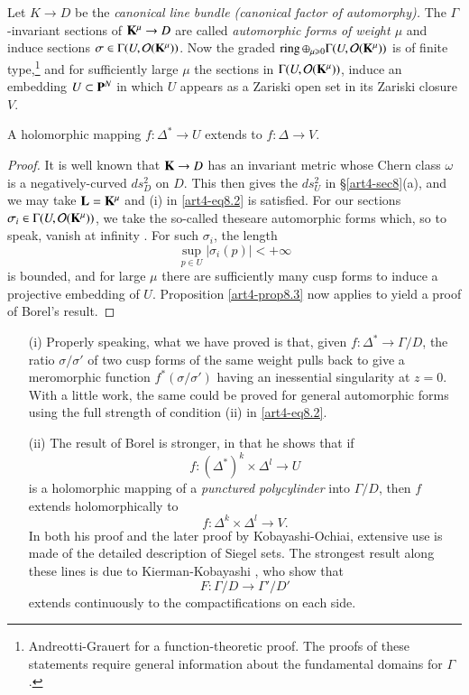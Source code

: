 Let $K \to D$ be the \textit{canonical line bundle (canonical factor of automorphy).} The $\Gamma$-invariant sections of $\mathbf{K}^\mu \to D$ are called \textit{automorphic forms of weight $\mu$} and induce sections $\sigma \in \Gamma (U, \mathcal{O} (\mathbf{K}^\mu))$. Now the graded $\operatorname{ring} \oplus_{\mu \geqslant 0} \Gamma (U, \mathcal{O}(\mathbf{K}^\mu))$ is of finite type,\footnote[36]{\cf Andreotti-Grauert \cite{art4-key1} for a function-theoretic proof. The proofs of these statements require general information about the fundamental domains for $\Gamma$.} and for sufficiently large $\mu$ the sections in $\Gamma (U,\mathcal{O} (\mathbf{K}^\mu))$, induce an embedding $U \subset \mathbf{P}^N$ in which $U$ appears as a Zariski open set in its Zariski closure $V$.

\begin{proposition}[Borel]\label{art4-eq8.12}
A holomorphic mapping $f : \Delta^\ast \to U$ extends to $f : \Delta \to V$.
\end{proposition}

\begin{proof}
It is well known that $\mathbf{K} \to D$ has an invariant metric whose Chern class $\omega$ is a negatively-curved $ds^2_D$ on $D$. This then gives the $ds^2_U$ in \S \ref{art4-sec8}(a), and we may take $\mathbf{L} = \mathbf{K}^\mu$ and (i) in \eqref{art4-eq8.2} is satisfied. For our sections $\sigma_i \in\Gamma (U,\mathcal{O} (\mathbf{K}^\mu))$, we take the so-called  these\pageoriginale are automorphic forms which, so to speak, vanish at infinity \cite{art4-key2}. For such $\sigma_i$, the length
$$
\sup_{p\in U} | \sigma_i(p) | < + \infty
$$
is bounded, and for large $\mu$ there are sufficiently many cusp forms to induce a projective embedding of $U$. Proposition \eqref{art4-prop8.3} now applies to yield a proof of Borel's result.
\end{proof}

\begin{remarks*}
\begin{itemize}
\item[(i)] Properly speaking, what we have proved is that, given $f: \Delta^\ast \to \Gamma / D$, the ratio $\sigma/\sigma'$ of two cusp forms of the same weight pulls back to give a meromorphic function $f^\ast (\sigma/\sigma')$ having an inessential singularity at $z = 0$. With a little work, the same could  be proved for general automorphic forms using the full strength of condition (ii) in \eqref{art4-eq8.2}.

\item[(ii)] The result of Borel \cite{art4-key5} is stronger, in that he shows that if 
$$
f : (\Delta^\ast)^k \times \Delta^l \to U
$$
is a holomorphic mapping of a \textit{punctured polycylinder} into $\Gamma/D$, then $f$ extends holomorphically to
$$
f : \Delta^k \times \Delta^l \to V.
$$
In both his proof and the later proof by Kobayashi-Ochiai, extensive use is made of the detailed description of Siegel sets. The strongest result along these lines is due to Kierman-Kobayashi \cite{art4-key32}, who show that
$$
F: \Gamma / D \to \Gamma' / D'
$$
extends continuously to the compactifications on each side.
\end{itemize}
\end{remarks*}

